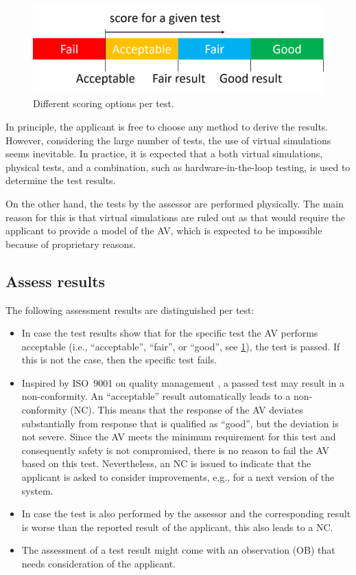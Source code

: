 \begin{figure}
	\centering
	\includegraphics[width=\linewidth]{figures/rating}
	\caption{Different scoring options per test.}
	\label{fig:rating}
\end{figure}

In principle, the applicant is free to choose any method to derive the results. However, considering the large number of tests, the use of virtual simulations seems inevitable. In practice, it is expected that a both virtual simulations, physical tests, and a combination, such as hardware-in-the-loop testing, is used to determine the test results.

On the other hand, the tests by the assessor are performed physically. The main reason for this is that virtual simulations are ruled out as that would require the applicant to provide a model of the AV, which is expected to be impossible because of proprietary reasons.



\subsection{Assess results}
\label{sec:assess results}

The following assessment results are distinguished per test:
\begin{itemize}
	\item In case the test results show that for the specific test the AV performs acceptable (i.e., ``acceptable'', ``fair'', or ``good'', see \cref{fig:rating}), the test is passed. If this is not the case, then the specific test fails.
	\item Inspired by ISO~9001 on quality management \autocite{ISO9001}, a passed test may result in a non-conformity. An “acceptable” result automatically leads to a non-conformity (NC). This means that the response of the AV deviates substantially from  response that is qualified as “good”, but the deviation is not severe. Since the AV meets the minimum requirement for this test and consequently safety is not compromised, there is no reason to fail the AV based on this test. Nevertheless, an NC is issued to indicate that the applicant is asked to consider improvements, e.g., for a next version of the system.
	\item In case the test is also performed by the assessor and the corresponding result is worse than the reported result of the applicant, this also leads to a NC.
	\item The assessment of a test result might come with an observation (OB) that needs consideration of the applicant. 
\end{itemize}

